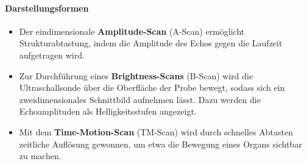\paragraph{Darstellungsformen}

\begin{itemize}
	\item Der eindimensionale \textbf{Amplitude-Scan} (A-Scan) ermöglicht Strukturabtastung, indem die Amplitude des
	Echos gegen die Laufzeit aufgetragen wird.
	\item Zur Durchführung eines \textbf{Brightness-Scans} (B-Scan) wird die Ultraschallsonde über die Oberfläche der Probe bewegt, sodass sich
	ein zweidimensionales Schnittbild aufnehmen lässt. Dazu werden die Echoamplituden als Helligkeitsstufen angezeigt.
	\item Mit dem \textbf{Time-Motion-Scan} (TM-Scan) wird durch schnelles Abtasten zeitliche Auflösung gewonnen, um etwa die Bewegung
	eines Organs sichtbar zu machen. 
\end{itemize}


